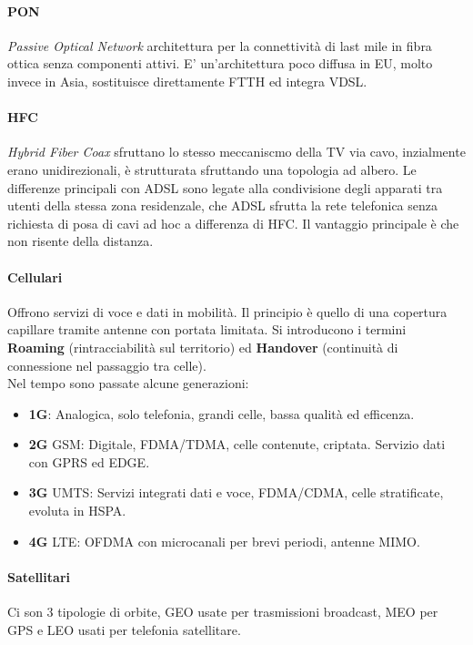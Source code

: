 \documentclass[12pt]{article}
\begin{document}
\paragraph{PON}
\textit{Passive Optical Network} architettura per la connettività di last mile in fibra ottica senza componenti attivi. E' un'architettura poco diffusa in EU, molto invece in Asia, sostituisce direttamente FTTH ed integra VDSL.
\paragraph{HFC}
\textit{Hybrid Fiber Coax} sfruttano lo stesso meccaniscmo della TV via cavo, inzialmente erano unidirezionali, è strutturata sfruttando una topologia ad albero. Le differenze principali con ADSL sono legate alla condivisione degli apparati tra utenti della stessa zona residenzale, che ADSL sfrutta la rete telefonica senza richiesta di posa di cavi ad hoc a differenza di HFC. Il vantaggio principale è che non risente della distanza.\\
\paragraph{Cellulari}
Offrono servizi di voce e dati in mobilità. Il principio è quello di una copertura capillare tramite antenne con portata limitata. Si introducono i termini \textbf{Roaming} (rintracciabilità sul territorio) ed \textbf{Handover} (continuità di connessione nel passaggio tra celle).\\
Nel tempo sono passate alcune generazioni:
\begin{itemize}
  \item \textbf{1G}: Analogica, solo telefonia, grandi celle, bassa qualità ed efficenza.
  \item \textbf{2G} GSM: Digitale, FDMA/TDMA, celle contenute, criptata. Servizio dati con GPRS ed EDGE.
  \item \textbf{3G} UMTS: Servizi integrati dati e voce, FDMA/CDMA, celle stratificate, evoluta in HSPA.
  \item \textbf{4G} LTE: OFDMA con microcanali per brevi periodi, antenne MIMO.
\end{itemize}
\paragraph{Satellitari}
Ci son 3 tipologie di orbite, GEO usate per trasmissioni broadcast, MEO per GPS e LEO usati per telefonia satellitare.
\end{document}
